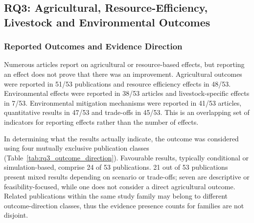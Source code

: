 \documentclass[11pt,a4paper]{article}
\begin{document}
\subsection{RQ3: Agricultural, Resource-Efficiency, Livestock and Environmental Outcomes}

\subsubsection{Reported Outcomes and Evidence Direction}

Numerous articles report on agricultural or resource-based effects,
but reporting an effect does not prove that there was an improvement.
Agricultural outcomes were reported in 51/53 publications and resource
efficiency effects in 48/53. Environmental effects were reported in
38/53 articles and livestock-specific effects in 7/53. Environmental
mitigation mechanisms were reported in 41/53 articles, quantitative results
in 47/53 and trade-offs in 45/53. This is an overlapping set of indicators
for reporting effects rather than the number of effects.

In determining what the results actually indicate, the
outcome was considered using four mutually exclusive publication classes (Table~\ref{tab:rq3_outcome_direction}). Favourable results, typically conditional or simulation-based, comprise 24 of 53 publications. 21 out of 53 publications present mixed results depending on scenario or trade-offs;
seven are descriptive or feasibility-focused, while one does not consider a direct agricultural outcome. Related publications within the same study family may belong to different outcome-direction classes, thus the evidence presence counts for families are not disjoint.
\end{document}

